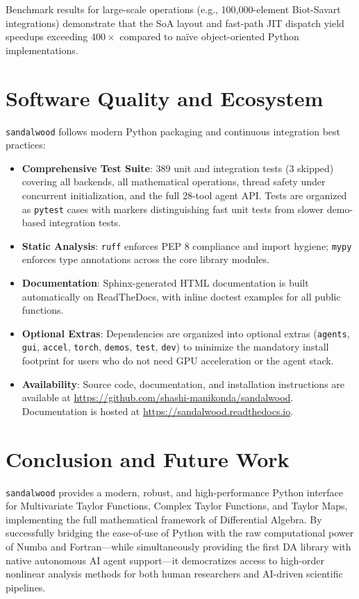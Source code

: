 \documentclass[aps,prb,reprint,superscriptaddress,nofootinbib]{revtex4-2}
\begin{document}
Benchmark results for large-scale operations (e.g., 100,000-element Biot-Savart integrations) demonstrate that the SoA layout and fast-path JIT dispatch yield speedups exceeding $400\times$ compared to na\"ive object-oriented Python implementations.

\section{Software Quality and Ecosystem}
\label{sec:quality}

\texttt{sandalwood} follows modern Python packaging and continuous integration best practices:

\begin{itemize}
    \item \textbf{Comprehensive Test Suite}: 389 unit and integration tests (3 skipped) covering all backends, all mathematical operations, thread safety under concurrent initialization, and the full 28-tool agent API. Tests are organized as \texttt{pytest} cases with markers distinguishing fast unit tests from slower demo-based integration tests.
    \item \textbf{Static Analysis}: \texttt{ruff} enforces PEP 8 compliance and import hygiene; \texttt{mypy} enforces type annotations across the core library modules.
    \item \textbf{Documentation}: Sphinx-generated HTML documentation is built automatically on ReadTheDocs, with inline doctest examples for all public functions.
    \item \textbf{Optional Extras}: Dependencies are organized into optional extras (\texttt{agents}, \texttt{gui}, \texttt{accel}, \texttt{torch}, \texttt{demos}, \texttt{test}, \texttt{dev}) to minimize the mandatory install footprint for users who do not need GPU acceleration or the agent stack.
    \item \textbf{Availability}: Source code, documentation, and installation instructions are available at \url{https://github.com/shashi-manikonda/sandalwood}. Documentation is hosted at \url{https://sandalwood.readthedocs.io}.
\end{itemize}

\section{Conclusion and Future Work}
\label{sec:conclusion}

\texttt{sandalwood} provides a modern, robust, and high-performance Python interface for Multivariate Taylor Functions, Complex Taylor Functions, and Taylor Maps, implementing the full mathematical framework of Differential Algebra. By successfully bridging the ease-of-use of Python with the raw computational power of Numba and Fortran---while simultaneously providing the first DA library with native autonomous AI agent support---it democratizes access to high-order nonlinear analysis methods for both human researchers and AI-driven scientific pipelines.
\end{document}
